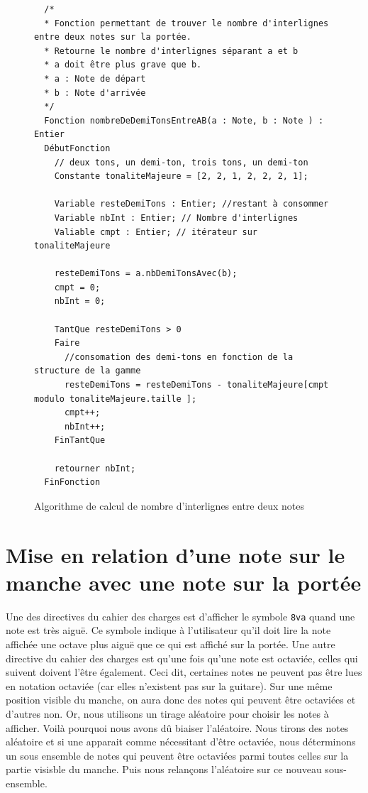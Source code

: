 \documentclass{scrreprt}
\begin{document}
\newpage
\begin{figure}[h!]
\vspace*{\fill} 
\begin{center}
  \begin{verbatim}
  /*
  * Fonction permettant de trouver le nombre d'interlignes entre deux notes sur la portée.
  * Retourne le nombre d'interlignes séparant a et b
  * a doit être plus grave que b.
  * a : Note de départ
  * b : Note d'arrivée
  */
  Fonction nombreDeDemiTonsEntreAB(a : Note, b : Note ) : Entier
  DébutFonction
    // deux tons, un demi-ton, trois tons, un demi-ton
    Constante tonaliteMajeure = [2, 2, 1, 2, 2, 2, 1];
    
    Variable resteDemiTons : Entier; //restant à consommer
    Variable nbInt : Entier; // Nombre d'interlignes
    Valiable cmpt : Entier; // itérateur sur tonaliteMajeure

    resteDemiTons = a.nbDemiTonsAvec(b);
    cmpt = 0;
    nbInt = 0;

    TantQue resteDemiTons > 0 
    Faire
      //consomation des demi-tons en fonction de la structure de la gamme
      resteDemiTons = resteDemiTons - tonaliteMajeure[cmpt modulo tonaliteMajeure.taille ];
      cmpt++;
      nbInt++;
    FinTantQue

    retourner nbInt;
  FinFonction
  \end{verbatim}
    \caption{Algorithme de calcul de nombre d'interlignes entre deux notes}
\end{center}
\vspace*{\fill}
\end{figure}
\newpage


\newpage
\section{Mise en relation d'une note sur le manche avec une note sur la portée}
\label{octava}
Une des directives du cahier des charges est d'afficher le symbole \texttt{8va} quand une note est très aiguë.
Ce symbole indique à l'utilisateur qu'il doit lire la note affichée une octave plus aiguë que ce qui est affiché sur la portée. 
Une autre directive du cahier des charges est qu'une fois qu'une note est octaviée, celles qui suivent doivent l'être également.
Ceci dit, certaines notes ne peuvent pas être lues en notation octaviée (car elles n'existent pas sur la guitare). 
Sur une même position visible du manche, on aura donc des notes qui peuvent être octaviées et d'autres non.
Or, nous utilisons un tirage aléatoire pour choisir les notes à afficher.
Voilà pourquoi nous avons dû biaiser l'aléatoire.
Nous tirons des notes aléatoire et si une apparait comme nécessitant d'être octaviée, nous déterminons un sous ensemble de notes qui peuvent être octaviées parmi toutes celles sur la partie visisble du manche.
Puis nous relançons l'aléatoire sur ce nouveau sous-ensemble. 
\newline
\end{document}

